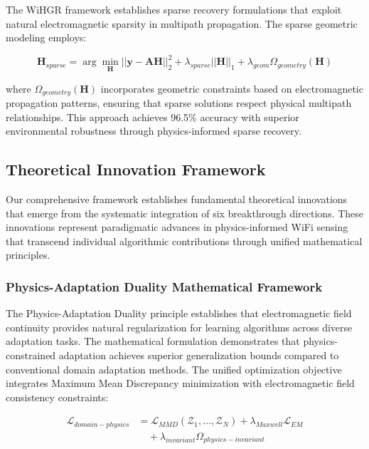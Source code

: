 \documentclass[journal]{IEEEtran}
\begin{document}
The WiHGR framework \cite{meng2021wihgr} establishes sparse recovery formulations that exploit natural electromagnetic sparsity in multipath propagation. The sparse geometric modeling employs:

\begin{equation}
\mathbf{H}_{sparse} = \arg\min_{\mathbf{H}} ||\mathbf{y} - \mathbf{A}\mathbf{H}||_2^2 + \lambda_{sparse} ||\mathbf{H}||_1 + \lambda_{geom} \Omega_{geometry}(\mathbf{H})
\label{eq:sparse_geometric}
\end{equation}

where $\Omega_{geometry}(\mathbf{H})$ incorporates geometric constraints based on electromagnetic propagation patterns, ensuring that sparse solutions respect physical multipath relationships. This approach achieves 96.5\% accuracy with superior environmental robustness through physics-informed sparse recovery.

\subsection{Theoretical Innovation Framework}

Our comprehensive framework establishes fundamental theoretical innovations that emerge from the systematic integration of six breakthrough directions. These innovations represent paradigmatic advances in physics-informed WiFi sensing that transcend individual algorithmic contributions through unified mathematical principles.

\subsubsection{Physics-Adaptation Duality Mathematical Framework}

The Physics-Adaptation Duality principle establishes that electromagnetic field continuity provides natural regularization for learning algorithms across diverse adaptation tasks. The mathematical formulation demonstrates that physics-constrained adaptation achieves superior generalization bounds compared to conventional domain adaptation methods. The unified optimization objective integrates Maximum Mean Discrepancy minimization with electromagnetic field consistency constraints:

\begin{align}
\mathcal{L}_{domain-physics} &= \mathcal{L}_{MMD}(\mathcal{Z}_1, \ldots, \mathcal{Z}_N) + \lambda_{Maxwell} \mathcal{L}_{EM} \nonumber \\
&\quad + \lambda_{invariant} \Omega_{physics-invariant} \label{eq:domain_physics_cluster}
\end{align}
\end{document}

